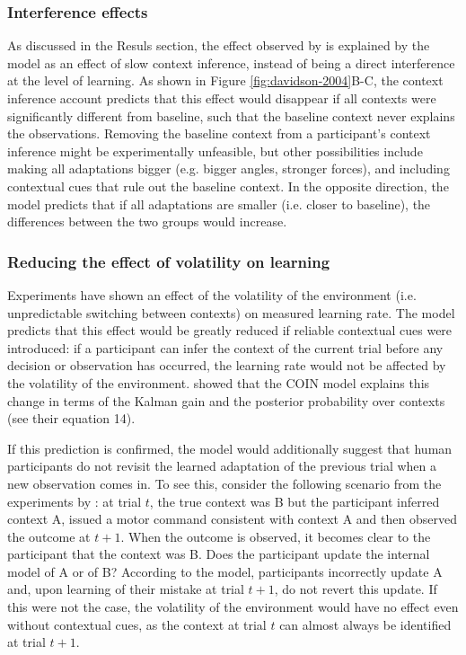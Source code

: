 \documentclass[a4paper,doc,floatsintext,natbib]{apa6}
\def \fref #1{Figure \ref{#1}}     %
\begin{document}
\subsubsection{Interference effects}
As discussed in the Resuls section, the effect observed by \cite{Davidson_Scaling_2004} is explained by the model as an effect of slow context inference, instead of being a direct interference at the level of learning. As shown in \fref{fig:davidson-2004}B-C, the context inference account predicts that this effect would disappear if all contexts were significantly different from baseline, such that the baseline context never explains the observations. Removing the baseline context from a participant's context inference might be experimentally unfeasible, but other possibilities include making all adaptations bigger (e.g. bigger angles, stronger forces), and including contextual cues that rule out the baseline context. In the opposite direction, the model predicts that if all adaptations are smaller (i.e. closer to baseline), the differences between the two groups would increase.

\subsubsection{Reducing the effect of volatility on learning}
Experiments \citep{Herzfeld_memory_2014,Heald_Contextual_2021} have shown an effect of the volatility of the environment (i.e. unpredictable switching between contexts) on measured learning rate. The model predicts that this effect would be greatly reduced if reliable contextual cues were introduced: if a participant can infer the context of the current trial before any decision or observation has occurred, the learning rate would not be affected by the volatility of the environment. \cite{Heald_Contextual_2021} showed that the COIN model explains this change in terms of the Kalman gain and the posterior probability over contexts (see their equation 14).

If this prediction is confirmed, the model would additionally suggest that human participants do not revisit the learned adaptation of the previous trial when a new observation comes in. To see this, consider the following scenario from the experiments by \cite{Herzfeld_memory_2014}: at trial $t$, the true context was B but the participant inferred context A, issued a motor command consistent with context A and then observed the outcome at $t + 1$. When the outcome is observed, it becomes clear to the participant that the context was B. Does the participant update the internal model of A or of B? According to the model, participants incorrectly update A and, upon learning of their mistake at trial $t+1$, do not revert this update. If this were not the case, the volatility of the environment would have no effect even without contextual cues, as the context at trial $t$ can almost always be identified at trial $t+1$.
\end{document}
